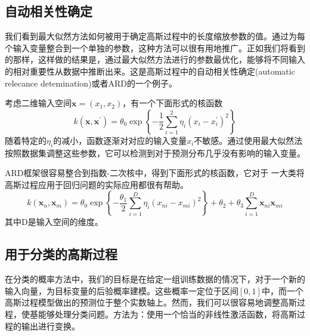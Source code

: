 \subsection*{自动相关性确定}
我们看到最大似然方法如何被用于确定高斯过程中的长度缩放参数的值。通过为每个输入变量整合到一个单独的参数，这种方法可以很有用地推广。正如我们将看到的那样，这样做的结果是，通过最大似然方法进行的参数最优化，能够将不同输入的相对重要性从数据中推断出来。这是高斯过程中的自动相关性确定(automatic relecance detemination)或者ARD的一个例子。

考虑二维输入空间$\boldsymbol{x}=(x_1,x_2)$，有一个下面形式的核函数
\begin{equation}
	k(\boldsymbol{x},\boldsymbol{x}^{'})=\theta_0\exp\left\{-\frac{1}{2}\sum_{i=1}^{2}\eta_i(x_i-x_i^{'})^2 \right\}
\end{equation}
随着特定的$\eta_i$的减小，函数逐渐对对应的输入变量$x_i$不敏感。通过使用最大似然法按照数据集调整这些参数，它可以检测到对于预测分布几乎没有影响的输入变量。

ARD框架很容易整合到指数-二次核中，得到下面形式的核函数，它对于 一大类将高斯过程应用于回归问题的实际应用都很有帮助。
\begin{equation}
	k(\boldsymbol{x}_n,\boldsymbol{x}_m)=\theta_0\exp\left\{-\frac{\theta_1}{2}\sum_{i=1}^{D}\eta_i(x_{ni}-x_{mi})^2 \right\}+\theta_2+\theta_3\sum_{i=1}^{D}\boldsymbol{x}_{ni}\boldsymbol{x}_{mi}
\end{equation}
其中D是输入空间的维度。
\subsection*{用于分类的高斯过程}
在分类的概率方法中，我们的目标是在给定一组训练数据的情况下，对于一个新的输入向量，为目标变量的后验概率建模。这些概率一定位于区间$[0,1]$中，而一个高斯过程模型做出的预测位于整个实数轴上。然而，我们可以很容易地调整高斯过程，使基能够处理分类问题。方法为：使用一个恰当的非线性激活函数，将高斯过程的输出进行变换。

